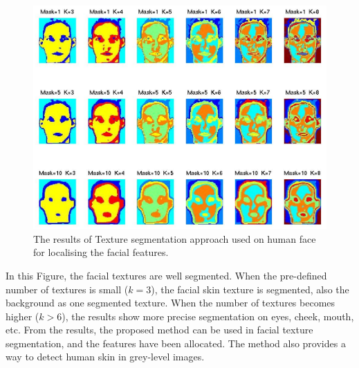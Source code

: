 \begin{figure}[ht]
 \begin{center}
  \includegraphics[width=\columnwidth]{ch3/figures/facesegmentgabor.png}
\caption{The results of Texture segmentation approach used on human face for localising the facial features.}
\label{fig:segmentfacegabor}
 \end{center}
\end{figure} 
In this Figure, the facial textures are well segmented. When the pre-defined number of textures is small ($k = 3$), the facial skin texture is segmented, also the background as one segmented texture. When the number of textures becomes higher ($k>6$), the results show more precise segmentation on eyes, cheek, mouth, etc. From the results, the proposed method can be used in facial texture segmentation, and the features have been allocated. The method also provides a way to detect human skin in grey-level images.